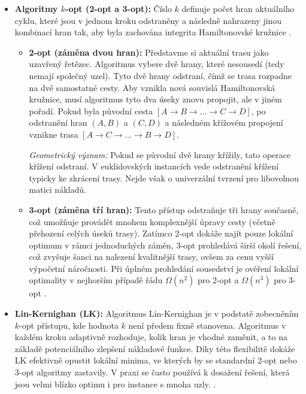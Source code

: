 \begin{itemize}
    \item \textbf{Algoritmy $k$-opt (2-opt a 3-opt)}\textbf{:} Číslo $k$ definuje počet hran aktuálního cyklu, které jsou v jednom kroku odstraněny a následně nahrazeny jinou kombinací hran tak, aby byla zachována integrita Hamiltonovské kružnice \cite{johnson1997tsp_local_search}.
    \begin{itemize}
    \item \textbf{2-opt (záměna dvou hran):} 
    Představme si aktuální trasu jako uzavřený řetězec. Algoritmus vybere dvě hrany, které nesousedí (tedy nemají společný uzel). Tyto dvě hrany odstraní, čímž se trasa rozpadne na dvě samostatné cesty. Aby vznikla nová souvislá Hamiltonovská kružnice, musí algoritmus tyto dva úseky znovu propojit, ale v jiném pořadí.
    Pokud byla původní cesta $[A \to B \to \dots \to C \to D]$, po odstranění hran $(A,B)$ a $(C,D)$ a následném křížovém propojení vznikne trasa $[A \to C \to \dots \to B \to D]$\cite{johnson1997tsp_local_search}. 
    
    
    \textit{Geometrický význam:} Pokud se původní dvě hrany křížily, tato operace křížení odstraní. V euklidovských instancích vede odstranění křížení typicky ke zkrácení trasy. Nejde však o univerzální tvrzení pro libovolnou matici nákladů.
        \item \textbf{3-opt (záměna tří hran):} Tento přístup odstraňuje tři hrany současně, což umožňuje provádět mnohem komplexnější úpravy cesty (včetně přehození celých úseků trasy). Zatímco 2-opt dokáže najít pouze lokální optimum v rámci jednoduchých záměn, 3-opt prohledává širší okolí řešení, což zvyšuje šanci na nalezení kvalitnější trasy, ovšem za cenu vyšší výpočetní náročnosti. Při úplném prohledání sousedství je ověření lokální optimality v nejhorším případě řádu $\Omega(n^2)$ pro 2-opt a $\Omega(n^3)$ pro 3-opt \cite{johnson1997tsp_local_search}.
\end{itemize}
    \item \textbf{Lin-Kernighan (LK):} Algoritmus Lin-Kernighan je v podstatě zobecněním $k$-opt přístupu, kde hodnota $k$ není předem fixně stanovena. Algoritmus v každém kroku adaptivně rozhoduje, kolik hran je vhodné zaměnit, a to na základě potenciálního zlepšení nákladové funkce. Díky této flexibilitě dokáže LK efektivně opustit lokální minima, ve kterých by se standardní 2-opt nebo 3-opt algoritmy zastavily. V praxi se často používá k dosažení řešení, která jsou velmi blízko optimu i pro instance s mnoha uzly. \cite{lin1973tsp,helsgaun2000lk,helsgaun2009lkh}.
\end{itemize}

